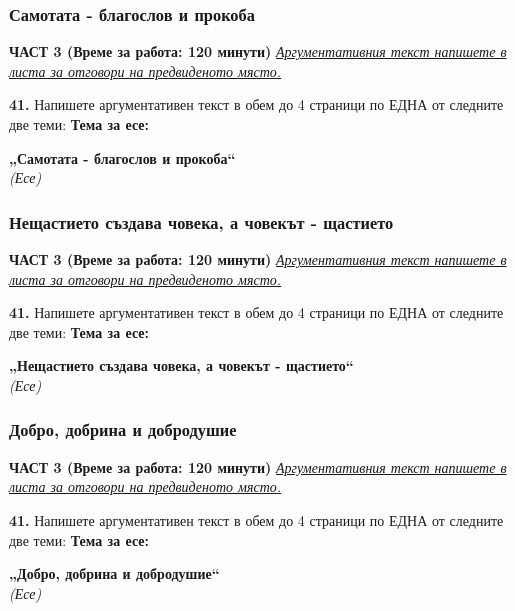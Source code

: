 \documentclass[12pt,a4paper]{article}
\begin{document}
\subsubsection{Самотата - благослов и прокоба}
\vspace{0.5cm}
\begin{center}
\textbf{ЧАСТ 3 (Време за работа: 120 минути)}
\vspace{0.2cm}
{\textit{\underline{Аргументативния текст напишете в листа за отговори на предвиденото място.}}}
\vspace{0.1cm}
\end{center}
\textbf{41.} Напишете аргументативен текст в обем до 4 страници по ЕДНА от следните две теми:
\vspace{0.2cm}
\textbf{Тема за есе:}
\vspace{0.1cm}
\begin{center}
\textbf{„Самотата - благослов и прокоба“}
\\
\textit{(Есе)}
\end{center}

\subsubsection{Нещастието създава човека, а човекът - щастието}
\vspace{0.5cm}
\begin{center}
\textbf{ЧАСТ 3 (Време за работа: 120 минути)}
\vspace{0.2cm}
{\textit{\underline{Аргументативния текст напишете в листа за отговори на предвиденото място.}}}
\vspace{0.1cm}
\end{center}
\textbf{41.} Напишете аргументативен текст в обем до 4 страници по ЕДНА от следните две теми:
\vspace{0.2cm}
\textbf{Тема за есе:}
\vspace{0.1cm}
\begin{center}
\textbf{„Нещастието създава човека, а човекът - щастието“}
\\
\textit{(Есе)}
\end{center}

\subsubsection{Добро, добрина и добродушие}
\vspace{0.5cm}
\begin{center}
\textbf{ЧАСТ 3 (Време за работа: 120 минути)}
\vspace{0.2cm}
{\textit{\underline{Аргументативния текст напишете в листа за отговори на предвиденото място.}}}
\vspace{0.1cm}
\end{center}
\textbf{41.} Напишете аргументативен текст в обем до 4 страници по ЕДНА от следните две теми:
\vspace{0.2cm}
\textbf{Тема за есе:}
\vspace{0.1cm}
\begin{center}
\textbf{„Добро, добрина и добродушие“}
\\
\textit{(Есе)}
\end{center}
\end{document}
